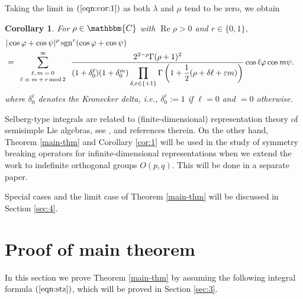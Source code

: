\documentclass[12pt]{article}
\numberwithin{equation}{section}
\newcommand{\assign}{:=}
\newcommand{\tmop}[1]{\ensuremath{\operatorname{#1}}}
\newcommand{\tmscript}[1]{\text{\scriptsize{$#1$}}}
\newtheorem{corollary}{Corollary}[section]
{\theorembodyfont{\rmfamily}\newtheorem{example}[corollary]{Example}}
\begin{document}
Taking the limit in $(\ref{eqn:cor:1})$ as both $\lambda$ and
$\mu$ tend to be
zero, we obtain

\begin{corollary}
  \label{cor:170599}For $\rho \in \mathbbm{C}$ with $\tmop{Re} \rho > 0$ and
  $r \in \{ 0, 1 \}$,
  \begin{eqnarray}
    & | \cos \varphi + \cos \psi |^{\rho} \tmop{sgn}^r (\cos \varphi + \cos
    \psi) &  \nonumber\\
    & = \displaystyle\sum_{\tmscript{\begin{array}{c}
      \ell, m = 0\\
      \ell \equiv m + r \tmop{mod} 2
    \end{array}}}^{\infty} \frac{2^{2 - \rho} \Gamma (\rho + 1)^2}{(1 +
    \delta_0^{\ell}) (1 + \delta_0^m) \displaystyle\prod_{\delta, \varepsilon \in \{ \pm 1
    \}} \Gamma \left( 1 + \frac{1}{2} (\rho + \delta \ell + \varepsilon m)
    \right)} \cos \ell \varphi \cos m \psi . &  \nonumber
  \end{eqnarray}
  where
  $\delta_0^\ell$ denotes the Kronecker delta, i.e.,
  $\delta_0^{\ell} \assign 1$ if $\ell = 0$ and $= 0$ otherwise.
\end{corollary}

Selberg-type integrals are related to (finite-dimensional) representation
theory of semisimple Lie algebras, see {\cite{forrester2008importance}},
{\cite{tarasov2003selberg}} and references therein. On the other hand, Theorem
\ref{main-thm} and Corollary \ref{cor:1} will be used in the study of symmetry
breaking operators for infinite-dimensional representations when we extend the
work {\cite{kobayashi2015symmetry}} to indefinite orthogonal groups $O (p,
q)$. This will be done in a separate paper.

Special cases and the limit case of Theorem \ref{main-thm} will be discussed
in Section \ref{sec:4}.

\section{Proof of main theorem}\label{sec:2}

In this section we prove Theorem \ref{main-thm} by assuming the following
integral formula $(\ref{eqn:stz})$, which will be proved in Section
\ref{sec:3}.
\end{document}
